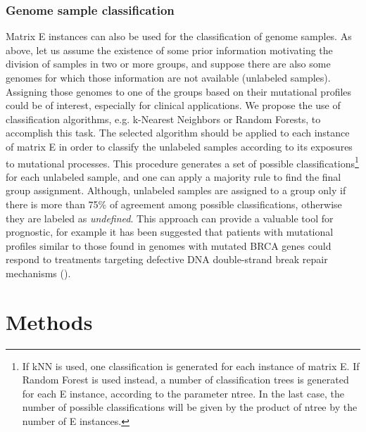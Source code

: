\documentclass{bioinfo}
\begin{document}
\subsubsection{Genome sample classification}
Matrix E instances can also be used for the classification of genome samples. 
As above, let us assume the existence of some prior information motivating the 
division of samples in two or more groups, and suppose there are also some genomes 
for which those information are not available (unlabeled samples). Assigning those 
genomes to one of the groups based on their mutational profiles could be of interest, 
especially for clinical applications. We propose the use of classification algorithms, 
e.g. k-Nearest Neighbors or Random Forests, to accomplish this task. The selected 
algorithm should be applied  to each instance of matrix E in order to classify the
 unlabeled samples according to its exposures to mutational processes.  This procedure 
generates a set of possible classifications\footnote{If kNN is used, one 
classification is generated for each instance of matrix E. If Random Forest is used 
instead, a number of classification trees is generated for each E instance, according 
to the parameter ntree. In the last case, the number of possible classifications will 
be given by the product of ntree by the number of E instances.} for each unlabeled 
sample, and one can apply a majority rule to find the final group assignment. 
Although, unlabeled samples are assigned to a group only if there is more than 75\% 
of agreement among possible classifications, otherwise they are labeled as \textit{undefined}. 
This approach can provide a valuable tool for prognostic, for example it has been 
suggested that patients with mutational profiles similar to those found in genomes 
with mutated BRCA genes could respond to treatments targeting defective DNA 
double-strand break repair mechanisms (\citealp{Ash}).

\section{Methods}
\end{document}
